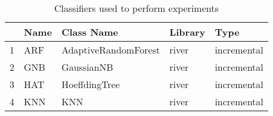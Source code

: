 \begin{table}
\footnotesize
\caption{Classifiers used to perform experiments}
\label{tab:algorithm}
\begin{tabular}{lllll}
\hline
 & Name & Class Name & Library & Type \\
\hline
1 & ARF & AdaptiveRandomForest & river & incremental \\
2 & GNB & GaussianNB & river & incremental \\
3 & HAT & HoeffdingTree & river & incremental \\
4 & KNN & KNN & river & incremental \\
\hline
\end{tabular}
\end{table}
